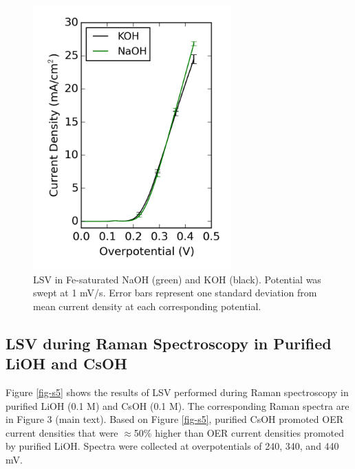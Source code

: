 \documentclass[journal=jpccck,manuscript=suppinfo,email=true]{achemso}
\begin{document}
\begin{figure}[h]
\centering
\includegraphics[width=3in]{./images/figures-supp-info/IvsV-Na-K-iron-01-19.png}
\caption{\label{fig-s4}LSV in Fe-saturated NaOH (green) and KOH (black). Potential was swept at 1 mV/s. Error bars represent one standard deviation from mean current density at each corresponding potential.}
\end{figure}

\subsection{LSV during Raman Spectroscopy in Purified LiOH and CsOH}
\label{sec-2-5}
Figure \ref{fig-s5} shows the results of LSV performed during Raman spectroscopy in purified LiOH (0.1 M) and CsOH (0.1 M). The corresponding Raman spectra are in Figure 3 (main text). Based on Figure \ref{fig-s5}, purified CsOH promoted OER current densities that were $\approx$50\% higher than OER current densities promoted by purified LiOH. Spectra were collected at overpotentials of 240, 340, and 440 mV.
\end{document}
